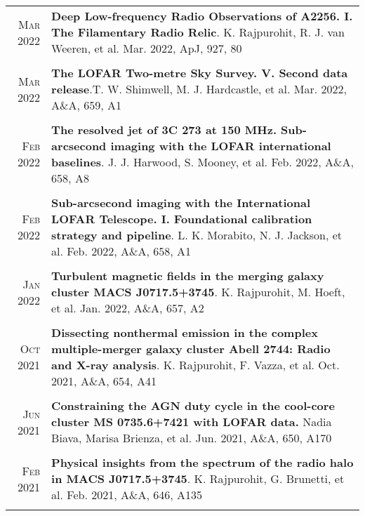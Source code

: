 \documentclass[11pt,a4paper,notitlepage]{article}
\begin{document}
\begin{tabular}{r|p{16.5cm}}

\textsc{Mar 2022} & \textbf{Deep Low-frequency Radio Observations of A2256. I. The Filamentary Radio Relic}. K. Rajpurohit, R. J. van Weeren, et al. Mar. 2022, ApJ, 927, 80 \\
\multicolumn{2}{c}{} \\

	
	\textsc{Mar 2022} & \textbf{The LOFAR Two-metre Sky Survey. V. Second data release}.T. W. Shimwell, M. J. Hardcastle, et al. Mar. 2022, A\&A, 659, A1 \\
	\multicolumn{2}{c}{} \\
	
	\textsc{Feb 2022} & \textbf{The resolved jet of 3C 273 at 150 MHz. Sub-arcsecond imaging with the LOFAR international baselines}. J. J. Harwood, S. Mooney, et al. Feb. 2022, A\&A, 658, A8 \\
	\multicolumn{2}{c}{} \\
	
	\textsc{Feb 2022} & \textbf{Sub-arcsecond imaging with the International LOFAR Telescope. I. Foundational calibration strategy and pipeline}. L. K. Morabito, N. J. Jackson, et al. Feb. 2022, A\&A, 658, A1\\
	\multicolumn{2}{c}{} \\
	
	\textsc{Jan 2022} & \textbf{Turbulent magnetic fields in the merging galaxy cluster MACS J0717.5+3745}. K. Rajpurohit, M. Hoeft, et al. Jan. 2022, A\&A, 657, A2 \\
	\multicolumn{2}{c}{} \\
	
	\textsc{Oct 2021} & \textbf{Dissecting nonthermal emission in the complex multiple-merger galaxy cluster Abell 2744: Radio and X-ray analysis}. K. Rajpurohit, F. Vazza, et al. Oct. 2021, A\&A, 654, A41\\
	\multicolumn{2}{c}{} \\
	
	\textsc{Jun 2021} & \textbf{Constraining the AGN duty cycle in the cool-core cluster MS 0735.6+7421 with LOFAR data.}  Nadia Biava, Marisa Brienza, et al. Jun. 2021, A\&A, 650, A170 \\
	\multicolumn{2}{c}{} \\
	
	
	\textsc{Feb 2021} & \textbf{Physical insights from the spectrum of the radio halo in MACS J0717.5+3745}. K. Rajpurohit, G. Brunetti, et al. Feb. 2021, A\&A, 646, A135 \\
	\multicolumn{2}{c}{} \\
	

\end{tabular}
\end{document}
